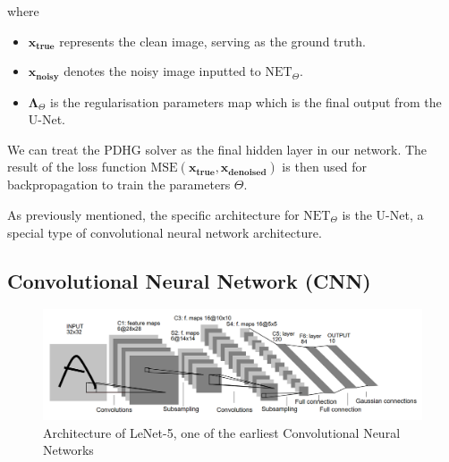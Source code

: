 \documentclass[12pt]{article}
\begin{document}
where
\begin{itemize}
    \item $\mathbf{x_{\text{true}}}$ represents the clean image, serving as the ground truth.
    \item $\mathbf{x_{\text{noisy}}}$ denotes the noisy image inputted to $\text{NET}_{\Theta}$.
    \item $\mathbf{\Lambda}_{\Theta}$ is the regularisation parameters map which is the final output from the U-Net. 
\end{itemize}

We can treat the PDHG solver as the final hidden layer in our network. 
The result of the loss function $\text{MSE}(\mathbf{x_{\text{true}}}, \mathbf{x_{\text{denoised}}})$ 
is then used for backpropagation to train the parameters $\Theta$.




As previously mentioned, the specific architecture for $\text{NET}_{\Theta}$ is the U-Net, a special type of convolutional neural network architecture.




\subsection{
Convolutional Neural Network (CNN) 
}

\begin{figure}[ht]
    \includegraphics[width=1\linewidth]{Le-Net 5.png}
    
    \caption{Architecture of LeNet-5, one of the earliest Convolutional Neural Networks \cite{726791}} 
    \label{fig:lenet}
\end{figure}
\end{document}
